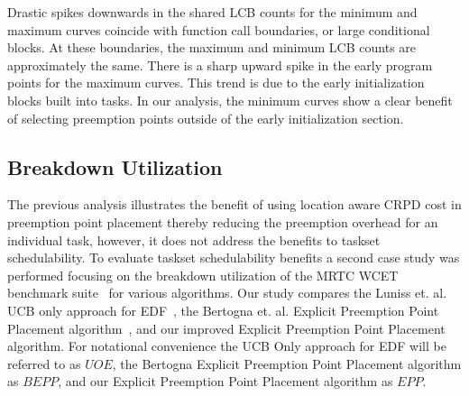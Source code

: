 Drastic spikes downwards in the shared LCB counts for the minimum and maximum curves coincide with function call boundaries, or large conditional blocks. At these boundaries, the maximum and minimum LCB counts are approximately the same. There is a sharp upward spike in the early program points for the maximum curves. This trend is due to the early initialization blocks built into tasks. In our analysis, the minimum curves show a clear benefit of selecting preemption points outside of the early initialization section.
\vspace{-10pt}
\subsection{Breakdown Utilization}
The previous analysis illustrates the benefit of using location aware CRPD cost in preemption point placement thereby reducing the preemption overhead
for an individual task, however, it does not address the benefits to taskset schedulability. To evaluate taskset schedulability benefits a second case study was performed focusing on the breakdown utilization of the MRTC WCET benchmark suite~\cite{mrtc:01} for various algorithms.  Our study compares the Luniss et. al. UCB only approach for EDF~\cite{lunniss:13}, the Bertogna et. al. Explicit Preemption Point Placement algorithm~\cite{bertogna:11}, and our improved Explicit Preemption Point Placement algorithm. For notational convenience the UCB Only approach for EDF will be referred to as ${UOE}$, the Bertogna Explicit Preemption Point Placement algorithm as ${BEPP}$, and our Explicit Preemption Point Placement algorithm as ${EPP}$.

